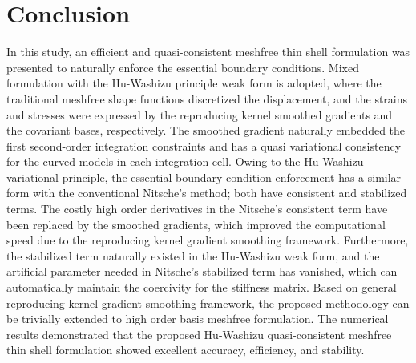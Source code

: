 \section{Conclusion}\label{conclusion}
In this study, an efficient and quasi-consistent meshfree thin shell formulation was presented to naturally enforce the essential boundary conditions.  Mixed formulation with the Hu-Washizu principle weak form is adopted, where the traditional meshfree shape functions discretized the displacement, and the strains and stresses were expressed by the reproducing kernel smoothed gradients and the covariant bases, respectively. The smoothed gradient naturally embedded the first second-order integration constraints and has a quasi variational consistency for the curved models in each integration cell. Owing to the Hu-Washizu variational principle, the essential boundary condition enforcement has a similar form with the conventional Nitsche’s method; both have consistent and stabilized terms. The costly high order derivatives in the Nitsche’s consistent term have been replaced by the smoothed gradients, which improved the computational speed due to the reproducing kernel gradient smoothing framework. Furthermore, the stabilized term naturally existed in the Hu-Washizu weak form, and the artificial parameter needed in Nitsche’s stabilized term has vanished, which can automatically maintain the coercivity for the stiffness matrix. Based on general reproducing kernel gradient smoothing framework, the proposed methodology can be trivially extended to high order basis meshfree formulation. The numerical results demonstrated that the proposed Hu-Washizu quasi-consistent meshfree thin shell formulation showed excellent accuracy, efficiency, and stability.

